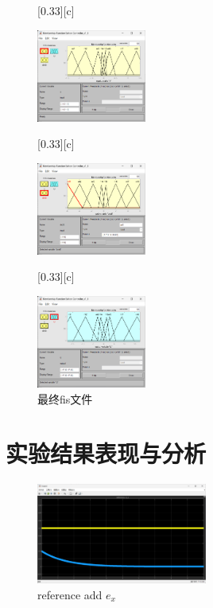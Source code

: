\documentclass[12pt,a4paper,UTF8]{article}
\begin{document}
\begin{figure}[!htbp]
    \centering
    [0.33\textwidth][c]{
        \centering
        \includegraphics[width=0.32\textwidth]{figures/2024-12-13-22-15-10.png} 
         
    }%
        [0.33\textwidth][c]{
        \centering
        \includegraphics[width=0.32\textwidth]{figures/2024-12-13-22-15-28.png} 
         
    }%
        [0.33\textwidth][c]{
        \centering
        \includegraphics[width=0.32\textwidth]{figures/2024-12-13-22-15-42.png} 
         
    }%
    \caption{最终fis文件}
     
\end{figure}



\clearpage
\section{实验结果表现与分析}

\begin{figure}[htbp] \centering \includegraphics[width=0.5\textwidth]{figures/2024-12-13-22-21-18.png} \caption{reference add $e_x$}  \end{figure}
\end{document}
